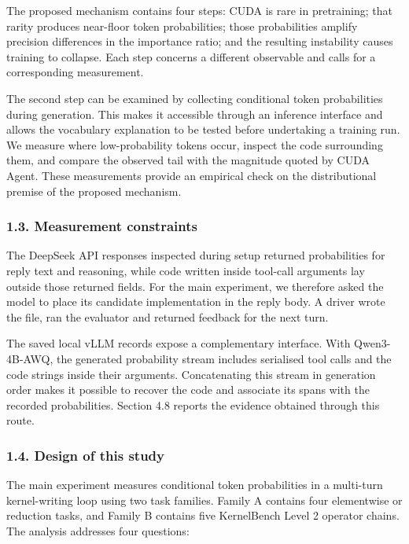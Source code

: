 \documentclass[
  11pt,
]{article}
\begin{document}
The proposed mechanism contains four steps: CUDA is rare in pretraining;
that rarity produces near-floor token probabilities; those probabilities
amplify precision differences in the importance ratio; and the resulting
instability causes training to collapse. Each step concerns a different
observable and calls for a corresponding measurement.

The second step can be examined by collecting conditional token
probabilities during generation. This makes it accessible through an
inference interface and allows the vocabulary explanation to be tested
before undertaking a training run. We measure where low-probability
tokens occur, inspect the code surrounding them, and compare the
observed tail with the magnitude quoted by CUDA Agent. These
measurements provide an empirical check on the distributional premise of
the proposed mechanism.

\hypertarget{measurement-constraints}{%
\subsubsection{1.3. Measurement
constraints}\label{measurement-constraints}}

The DeepSeek API responses inspected during setup returned probabilities
for reply text and reasoning, while code written inside tool-call
arguments lay outside those returned fields. For the main experiment, we
therefore asked the model to place its candidate implementation in the
reply body. A driver wrote the file, ran the evaluator and returned
feedback for the next turn.

The saved local vLLM records expose a complementary interface. With
Qwen3-4B-AWQ, the generated probability stream includes serialised tool
calls and the code strings inside their arguments. Concatenating this
stream in generation order makes it possible to recover the code and
associate its spans with the recorded probabilities. Section 4.8 reports
the evidence obtained through this route.

\hypertarget{design-of-this-study}{%
\subsubsection{1.4. Design of this study}\label{design-of-this-study}}

The main experiment measures conditional token probabilities in a
multi-turn kernel-writing loop using two task families. Family A
contains four elementwise or reduction tasks, and Family B contains five
KernelBench Level 2 operator chains. The analysis addresses four
questions:
\end{document}
